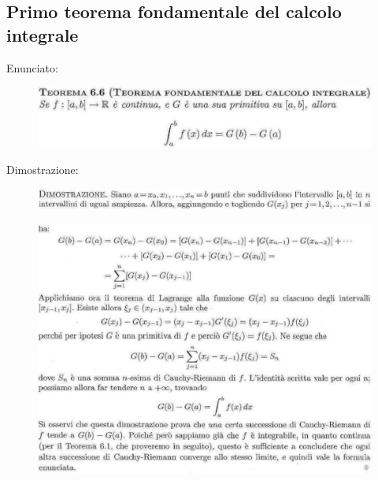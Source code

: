 \documentclass[a4paper, 9pt]{report}
\begin{document}
\subsection*{Primo teorema fondamentale del calcolo integrale}
Enunciato:\begin{figure}[h!]
    \includegraphics[width=\linewidth]{../dim/integrale1.PNG}
\end{figure}
\newline
Dimostrazione:\begin{figure}[h!]
    \includegraphics[width=\linewidth]{../dim/integrale2.PNG}
\end{figure}
\newline\begin{figure}[h!]
    \includegraphics[width=\linewidth]{../dim/integrale3.PNG}
\end{figure}
\newpage
\end{document}
